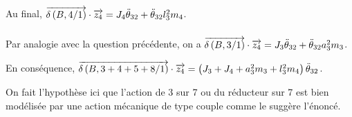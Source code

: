 \documentclass[10pt,fleqn]{article} %
\begin{document}
  Au final,  $\overrightarrow{\delta \left( {B}, {4} /{1}\right)}\cdot\overrightarrow{z_4} = J_4 \ddot{\theta}_{32}+\ddot{\theta}_{32}l_3^2 m_4 $.
  



%
%
%  
%  
%
  



\subparagraph{}%


Par analogie avec la question précédente, on a $\overrightarrow{\delta \left( {B}, {3} /{1}\right)}\cdot\overrightarrow{z_4}= J_3\ddot{\theta}_{32}+\ddot{\theta}_{32}a_3^2 m_3$.

En conséquence,  $\overrightarrow{\delta \left( {B}, {3+4+5+8} /{1}\right)}\cdot\overrightarrow{z_4} = \left(J_3+J_4+a_3^2 m_3  +l_3^2 m_4\right) \ddot{\theta}_{32}$.

\begin{remarque}
On fait l'hypothèse ici que l'action de 3 sur 7 ou du réducteur sur 7 est bien modélisée par une action mécanique de type couple comme le suggère l'énoncé.
\end{remarque}
\end{document}
